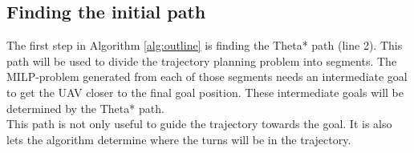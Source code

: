 

\subsection{Finding the initial path}
The first step in Algorithm \ref{alg:outline} is finding the Theta* path (line 2). This path will be used to divide the trajectory planning problem into segments. The MILP-problem generated from each of those segments needs an intermediate goal to get the UAV closer to the final goal position. These intermediate goals will be determined by the Theta* path. \\
This path is not only useful to guide the trajectory towards the goal. It is also lets the algorithm determine where the turns will be in the trajectory.

